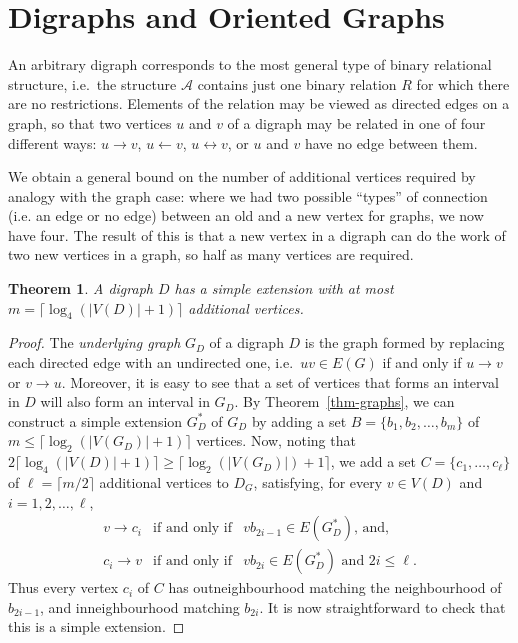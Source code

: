 \documentclass[11pt]{article}
\newtheorem{theorem}{Theorem}[section]
\begin{document}
\section{Digraphs and Oriented Graphs}\label{sec-digraphs}
An arbitrary digraph corresponds to the most general type of binary relational structure, i.e.\ the structure ${\mathcal{A}}$ contains just one binary relation $R$ for which there are no restrictions. Elements of the relation may be viewed as directed edges on a graph, so that two vertices $u$ and $v$ of a digraph may be related in one of four different ways: $u\rightarrow v$, $u\leftarrow v$, $u\leftrightarrow v$, or $u$ and $v$ have no edge between them.

We obtain a general bound on the number of additional vertices required by analogy with the graph case: where we had two possible ``types'' of connection (i.e. an edge or no edge) between an old and a new vertex for graphs, we now have four. The result of this is that a new vertex in a digraph can do the work of two new vertices in a graph, so half as many vertices are required.

\begin{theorem}
A digraph $D$ has a simple extension with at most $m=\lceil\log_4(|V(D)|+1)\rceil$ additional vertices.
\end{theorem}

\begin{proof}
The \emph{underlying graph} $G_D$ of a digraph $D$ is the graph formed by replacing each directed edge with an undirected one, i.e.\ $uv\in E(G)$ if and only if $u\rightarrow v$ or $v\rightarrow u$. Moreover, it is easy to see that a set of vertices that forms an interval in $D$ will also form an interval in $G_D$. By Theorem~\ref{thm-graphs}, we can construct a simple extension $G_D^*$ of $G_D$ by adding a set $B=\{b_1,b_2,\ldots,b_m\}$ of $m\leq\lceil\log_2(|V(G_D)|+1)\rceil$ vertices. Now, noting that $2\lceil\log_4(|V(D)|+1)\rceil \geq \lceil\log_2(|V(G_D)|)+1\rceil$, we add a set $C=\{c_1,\ldots,c_\ell\}$ of $\ell= \lceil m/2\rceil$ additional vertices to $D_G$, satisfying, for every $v \in V(D)$ and $i=1,2,\ldots, \ell$,
\begin{eqnarray*}
v\rightarrow c_i&\textrm{if and only if}& vb_{2i-1}\in E(G_D^*)\textrm{, and,}\\
c_i\rightarrow v&\textrm{if and only if}& vb_{2i}\in E(G_D^*)\textrm{ and }2i\leq \ell.\end{eqnarray*}
Thus every vertex $c_i$ of $C$ has outneighbourhood matching the neighbourhood of $b_{2i-1}$, and inneighbourhood matching $b_{2i}$. It is now straightforward to check that this is a simple extension.
\end{proof}
\end{document}
